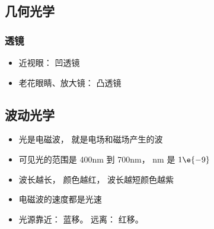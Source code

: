 
\begin{issues}
\issueDraft
\end{issues}

\subsection{几何光学}
\subsubsection{透镜}
\begin{itemize}
\item 近视眼： 凹透镜
\item 老花眼睛、放大镜： 凸透镜
\end{itemize}

\subsection{波动光学}
\begin{itemize}
\item 光是电磁波， 就是电场和磁场产生的波
\item 可见光的范围是 400nm 到 700nm， nm 是 $1\e{-9}$
\item 波长越长， 颜色越红， 波长越短颜色越紫
\item 电磁波的速度都是光速
\item 光源靠近： 蓝移。 远离： 红移。
\end{itemize}

